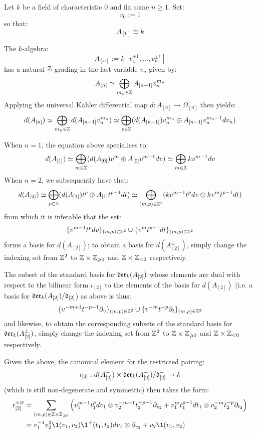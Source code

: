         \begin{remark} \label{remark: basis_for_global_functions_on_split_tori}
            Let $k$ be a field of characteristic $0$ and fix some $n \geq 1$. Set:
                $$v_0 := 1$$
            so that:
                $$A_{[0]} \cong k$$

            The $k$-algebra:
                $$A_{[n]} := k[v_1^{\pm 1}, ..., v_n^{\pm 1}]$$
            has a natural $\mathbb{Z}$-grading in the last variable $v_n$ given by:
                $$A_{[n]} \simeq \bigoplus_{m_n \in \mathbb{Z}} A_{[n - 1]} v_n^{m_n}$$
            Applying the universal K\"ahler differential map $d: A_{[n]} \to \Omega_{[n]}$ then yields:
                $$d( A_{[n]} ) \simeq \bigoplus_{m_n \in \mathbb{Z}} d( A_{[n - 1]} v_n^{m_n} ) \simeq \bigoplus_{p \in \mathbb{Z}} ( d( A_{[n - 1]} ) v_n^{m_n} \oplus A_{[n - 1]} v_n^{m_n - 1} dv_n )$$

            When $n = 1$, the equation above specialises to:
                $$d(A_{[1]}) \simeq \bigoplus_{m \in \mathbb{Z}} ( d( A_{[0]} ) v^m \oplus A_{[0]} v^{m - 1} dv ) \simeq \bigoplus_{m \in \mathbb{Z}} k v^{m - 1} dv$$
            When $n = 2$, we subsequently have that:
                $$d(A_{[2]}) \simeq \bigoplus_{p \in \mathbb{Z}} ( d(A_{[1]}) t^p \oplus A_{[1]} t^{p - 1} dt ) \simeq \bigoplus_{(m, p) \in \mathbb{Z}^2} ( k v^{m - 1} t^p dv \oplus k v^m t^{p - 1} dt )$$
            from which it is inferable that the set:
                $$\{v^{m - 1} t^p dv\}_{(m, p) \in \mathbb{Z}^2} \cup \{v^m t^{p - 1} dt\}_{(m, p) \in \mathbb{Z}^2}$$
            forms a basis for $d(A_{[2]})$; to obtain a basis for $d(A_{[2]}^{\pm})$, simply change the indexing set from $\mathbb{Z}^2$ to $\Z \x \Z_{\geq 0}$ and $\Z \x \Z_{< 0}$ respectively.

            The subset of the standard basis for $\mathfrak{der}_k(A_{[2]})$ whose elements are dual with respect to the bilinear form $\iota_{[2]}$ to the elements of the basis for $d(A_{[2]})$ (i.e. a basis for $\mathfrak{der}_k(A_{[2]})/\mathfrak{d}_{[2]}$) as above is thus:
                $$\{v^{-m + 1} t^{-p - 1} \partial_v\}_{(m, p) \in \mathbb{Z}^2} \cup \{v^{-m} t^{-p} \partial_t\}_{(m, p) \in \mathbb{Z}^2}$$
            and likewise, to obtain the corresponding subsets of the standard basis for $\mathfrak{der}_k(A_{[2]}^{\pm})$, simply change the indexing set from $\mathbb{Z}^2$ to $\Z \x \Z_{\geq 0}$ and $\Z \x \Z_{< 0}$ respectively.

            Given the above, the canonical element for the restricted pairing:
                $$\iota_{[2]}: d(A_{[2]}^+) \x \der_k( A_{[2]}^- )/\d_{[2]}^- \to k$$
            (which is still non-degenerate and symmetric) then takes the form:
                $$
                    \begin{aligned}
                        \sfr_{[2]}^{+ \varnothing} & = \sum_{(m, p) \in \Z \x \Z_{\geq 0}} \left( v_1^{m - 1} t_1^p dv_1 \tensor v_2^{-m + 1} t_2^{-p - 1} \del_{v_2} + v_1^m t_1^{p - 1} dt_1 \tensor v_2^{-m} t_2^{-p} \del_{t_2} \right)
                        \\
                        & = v_1^{-1} v_2^2 \1(v_1, v_2) \1^+(t_1, t_2) dv_1 \tensor \del_{v_2} + v_2 \1(v_1, v_2) 
                    \end{aligned}
                $$
        \end{remark}

